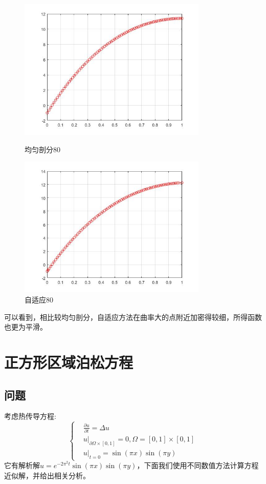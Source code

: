 \documentclass[12pt,fontset=mac]{ctexart}
\begin{document}
\begin{figure}[H]
	\centering
	\begin{minipage}[t]{0.48\textwidth}
		\centering
		\includegraphics[width=9cm]{方程三，均匀剖分80.jpg}
		\caption{均匀剖分80}
	\end{minipage}
	\begin{minipage}[t]{0.48\textwidth}
		\centering
		\includegraphics[width=9cm]{方程三，自适应80.jpg}
		\caption{自适应80}
	\end{minipage}
\end{figure}
可以看到，相比较均匀剖分，自适应方法在曲率大的点附近加密得较细，所得函数也更为平滑。
\section{正方形区域泊松方程}
\subsection{问题}
考虑热传导方程:
$$
\left\{
\begin{aligned}
&\frac{\partial u}{\partial t} = \Delta u\\
&u|_{\partial \Omega\times[0,1]} = 0, \Omega = [0,1]\times [0,1]\\
&u|_{t=0}=\sin(\pi x)\sin(\pi y)
\end{aligned}
\right.
$$
它有解析解$u = e^{-2\pi^2t}\sin(\pi x)\sin(\pi y)$，下面我们使用不同数值方法计算方程近似解，并给出相关分析。
\end{document}
